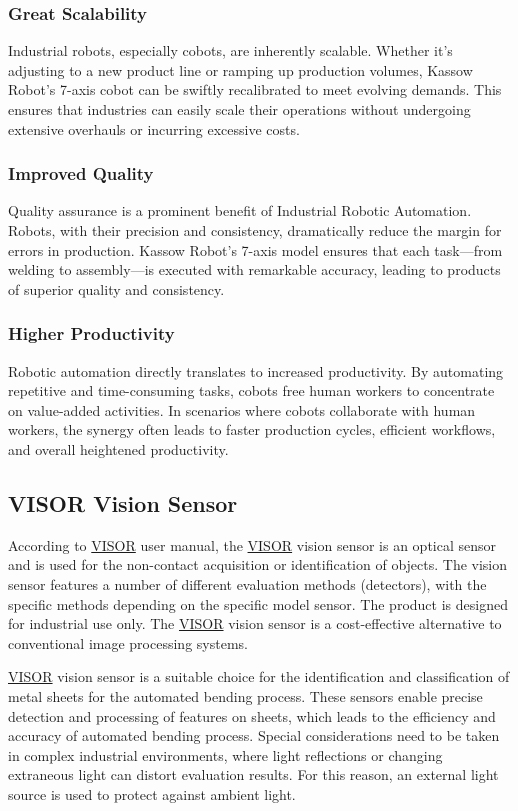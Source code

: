     \subsubsection{Great Scalability}
    Industrial robots, especially cobots, are inherently scalable. Whether it's adjusting to a new product line or ramping up production volumes, Kassow Robot's 7-axis cobot can be swiftly recalibrated to meet evolving demands. 
    This ensures that industries can easily scale their operations without undergoing extensive overhauls or incurring excessive costs.

    \subsubsection*{Improved Quality}
    Quality assurance is a prominent benefit of Industrial Robotic Automation. Robots, with their precision and consistency, dramatically reduce the margin for errors in production. 
    Kassow Robot's 7-axis model ensures that each task—from welding to assembly—is executed with remarkable accuracy, leading to products of superior quality and consistency.

    \subsubsection*{Higher Productivity}

    Robotic automation directly translates to increased productivity. By automating repetitive and time-consuming tasks, cobots free human workers to concentrate on value-added activities. 
    In scenarios where cobots collaborate with human workers, the synergy often leads to faster production cycles, efficient workflows, and overall heightened productivity.

    
\subsection{VISOR\textsuperscript{\textregistered} Vision Sensor}
\label{sec:visor}
    According to \hyperref[acro:VISOR]{VISOR}\textsuperscript{\textregistered} \cite[page 22]{visor_user_manual} user manual, the \hyperref[acro:VISOR]{VISOR}\textsuperscript{\textregistered} vision sensor is an optical sensor and is used for the non-contact acquisition or identification of objects.
    The vision sensor features a number of different evaluation methods (detectors), with the specific methods
    depending on the specific model sensor. The product is designed for industrial use only. The \hyperref[acro:VISOR]{VISOR}\textsuperscript{\textregistered} vision sensor is a cost-effective alternative to conventional image processing systems.

    \hyperref[acro:VISOR]{VISOR}\textsuperscript{\textregistered} vision sensor is a suitable choice for the identification and classification of metal sheets for the automated bending process.
    These sensors enable precise detection and processing of features on sheets, which leads to the efficiency and accuracy of automated bending process.
    Special considerations need to be taken in complex industrial environments, where light reflections or changing extraneous light can distort evaluation results. For this reason, an external light source is used to protect against ambient light.